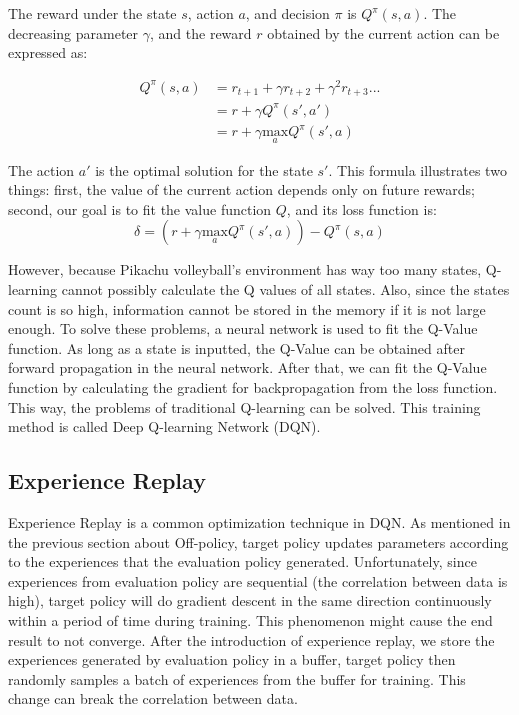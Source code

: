 \documentclass[sigconf]{acmart}
\begin{document}
The reward under the state $s$, action $a$, and decision $\pi$ is $Q^\pi(s,a)$. The decreasing parameter $\gamma$, and the reward $r$ obtained by the current action can be expressed as:

$$
\begin{aligned}
  Q^{\pi}(s, a) &= r_{t+1} + \gamma r_{t+2} + \gamma^2 r_{t+3} ... \\
  &= r + \gamma Q^{\pi}(s', a') \\
  &= r + \gamma \underset{a}{\text{max}} Q^{\pi}(s', a)
  \end{aligned}
$$

The action $a'$ is the optimal solution for the state $s'$. This formula illustrates two things: first, the value of the current action depends only on future rewards; second, our goal is to fit the value function $Q$, and its loss function is:
$$
\delta = (r + \gamma \underset{a}{\text{max}} Q^{\pi}(s', a)) - Q^{\pi}(s, a)
$$

However, because Pikachu volleyball's environment has way too many states, Q-learning cannot possibly calculate the Q values of all states. Also, since the states count is so high, information cannot be stored in the memory if it is not large enough. To solve these problems, a neural network is used to fit the Q-Value function. As long as a state is inputted, the Q-Value can be obtained after forward propagation in the neural network. After that, we can fit the Q-Value function by calculating the gradient for backpropagation from the loss function. This way, the problems of traditional Q-learning can be solved. This training method is called Deep Q-learning Network (DQN).


\subsection{Experience Replay}
Experience Replay is a common optimization technique in DQN. As mentioned in the previous section about Off-policy, target policy updates parameters according to the experiences that the evaluation policy generated. Unfortunately, since experiences from evaluation policy are sequential (the correlation between data is high), target policy will do gradient descent in the same direction continuously within a period of time during training. This phenomenon might cause the end result to not converge. After the introduction of experience replay, we store the experiences generated by evaluation policy in a buffer, target policy then randomly samples a batch of experiences from the buffer for training. This change can break the correlation between data.
\end{document}
